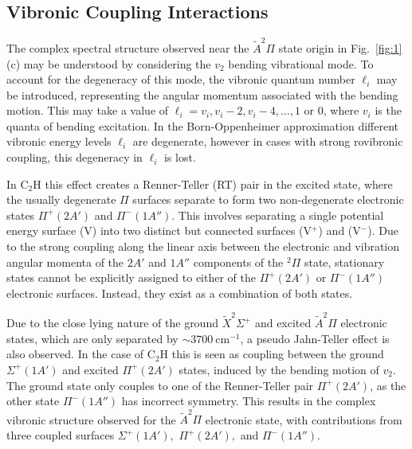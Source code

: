 \documentclass[journal=jpcafh,manuscript=article,layout=onecolumn, 12pt]{achemso}
\begin{document}
\subsection{Vibronic Coupling Interactions}
The complex spectral structure observed near the $\tilde{A}^2\Pi$ state origin in Fig.~\ref{fig:1}(c) may be understood by considering the $v_2$ bending vibrational mode. To account for the degeneracy of this mode, the vibronic quantum number $\ell_i$ may be introduced, representing the angular momentum associated with the bending motion. This may take a value of $\ell_i = v_i, v_i-2, v_i-4,\dots,1$ or $0$, where $v_i$ is the quanta of bending excitation. In the Born-Oppenheimer approximation different vibronic energy levels $\ell_i$ are degenerate, however in cases with strong rovibronic coupling, this degeneracy in $\ell_i$ is lost. 

In C$_2$H this effect creates a Renner-Teller (RT) pair in the excited state, where the usually degenerate $\Pi$ surfaces separate to form two non-degenerate electronic states $\Pi^+ (2A')$ and $\Pi^-(1A'')$. This involves separating a single potential energy surface (V) into two distinct but connected surfaces (V$^+$) and (V$^-$). Due to the strong coupling along the linear axis between the electronic and vibration angular momenta of the $2A'$ and $1A''$ components of the $^2\Pi$ state, stationary states cannot be explicitly assigned to either of the $\Pi^+(2A')$ or $\Pi^-(1A'')$ electronic surfaces. Instead, they exist as a combination of both states.

Due to the close lying nature of the ground {$\tilde{X} ^2\Sigma^+$} and excited {$\tilde{A} ^2\Pi$} electronic states, which are only separated by $\sim3700~$cm$^{-1}$, a pseudo Jahn-Teller effect is also observed. %
In the case of C$_2$H this is seen as coupling between the ground $\Sigma^+(1A')$ and excited $\Pi^+(2A')$ states, induced by the bending motion of $v_2$. The ground state only couples to one of the Renner-Teller pair $\Pi^+(2A')$, as the other state $\Pi^-(1A'')$ has incorrect symmetry. This results in the complex vibronic structure observed for the $\tilde{A}^2\Pi$ electronic state, with contributions from three coupled surfaces $\Sigma^+(1A'),$ $\Pi^+(2A'),$ and $\Pi^-(1A'')$.
\end{document}
